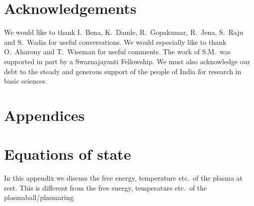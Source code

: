 \documentclass[12pt,a4paper]{article}
\begin{document}
%


\section*{Acknowledgements}

We would like to thank I.~Bena, K.~Damle,  R.~Gopakumar, R.~Jena,
S.~Raju and S.~Wadia for useful conversations. We would especially
like to thank O.~Aharony and T.~Wiseman for useful comments. The
work of S.M.\ was supported in part by a Swarnajayanti Fellowship.
We must also acknowledge our debt to the steady and generous support
of the people of India for research in basic sciences.




\section*{Appendices}
\appendix


\section{Equations of state}\label{app:eqstate}

In this appendix we discuss the free energy, temperature etc.\ of
the plasma at rest. This is different from the free energy,
temperature etc.\ of the plasmaball/plasmaring. %
\end{document}
